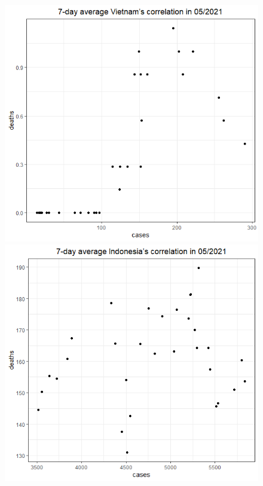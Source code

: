 \documentclass[a4paper]{article}
\theoremstyle{definition}
\begin{document}
\begin{enumerate}[1)]
\begin{figure}[H]
\begin{center}
        \includegraphics[scale = 0.3]{ix/ix.3/VN_05_2021.png}
        \includegraphics[scale = 0.3]{ix/ix.3/IDN_05_2021.png}

\end{center}
\end{figure}
\end{enumerate}
\end{document}
